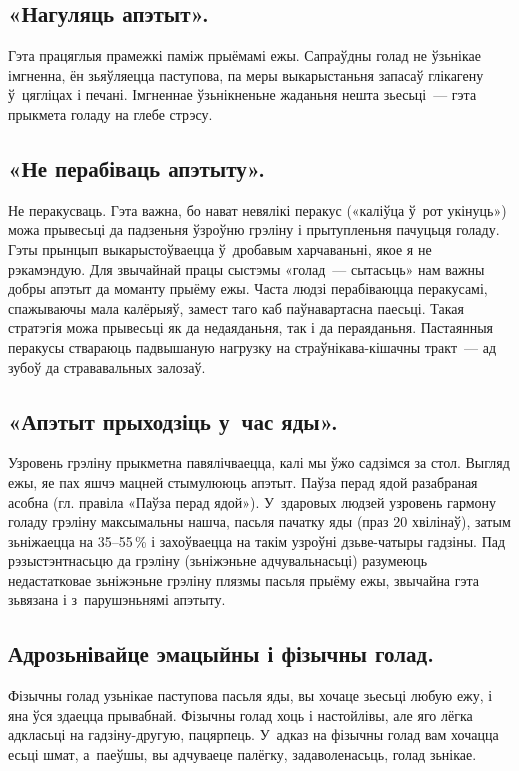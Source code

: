 \subsection{«Нагуляць апэтыт».}
Гэта працяглыя прамежкі паміж прыёмамі ежы. Сапраўдны голад не ўзьнікае імгненна, ён зьяўляецца паступова, па меры выкарыстаньня запасаў глікагену ў~цягліцах і печані. Імгненнае ўзьнікненьне жаданьня нешта зьесьці~--- гэта прыкмета голаду на глебе стрэсу.

\subsection{«Не перабіваць апэтыту».}
Не перакусваць. Гэта важна, бо нават невялікі перакус («каліўца ў~рот укінуць») можа прывесьці да падзеньня ўзроўню грэліну і прытупленьня пачуцьця голаду. Гэты прынцып выкарыстоўваецца ў~дробавым харчаваньні, якое я не рэкамэндую. Для звычайнай працы сыстэмы «голад~--- сытасьць» нам важны добры апэтыт да моманту прыёму ежы. Часта людзі перабіваюцца перакусамі, спажываючы мала калёрыяў, замест таго каб паўнавартасна паесьці. Такая стратэгія можа прывесьці як да недаяданьня, так і да пераяданьня. Пастаянныя перакусы ствараюць падвышаную нагрузку на страўнікава-кішачны тракт~--- ад зубоў да стрававальных залозаў.


\subsection{«Апэтыт прыходзіць у~час яды».}
Узровень грэліну прыкметна павялічваецца, калі мы ўжо садзімся за стол. Выгляд ежы, яе пах яшчэ мацней стымулююць апэтыт. Паўза перад ядой разабраная асобна (гл. правіла «Паўза перад ядой»). У~здаровых людзей узровень гармону голаду грэліну максымальны нашча, пасьля пачатку яды (праз 20 хвілінаў), затым зьніжаецца на 35--55\,\% і захоўваецца на такім узроўні дзьве-чатыры гадзіны. Пад рэзыстэнтнасьцю да грэліну (зьніжэньне адчувальнасьці) разумеюць недастатковае зьніжэньне грэліну плязмы пасьля прыёму ежы, звычайна гэта зьвязана і з~парушэньнямі апэтыту.

\subsection{Адрозьнівайце эмацыйны і фізычны голад.}
Фізычны голад узьнікае паступова пасьля яды, вы хочаце зьесьці любую ежу, і яна ўся здаецца прывабнай. Фізычны голад хоць і настойлівы, але яго лёгка адкласьці на гадзіну-другую, пацярпець. У~адказ на фізычны голад вам хочацца есьці шмат, а~паеўшы, вы адчуваеце палёгку, задаволенасьць, голад зьнікае.

